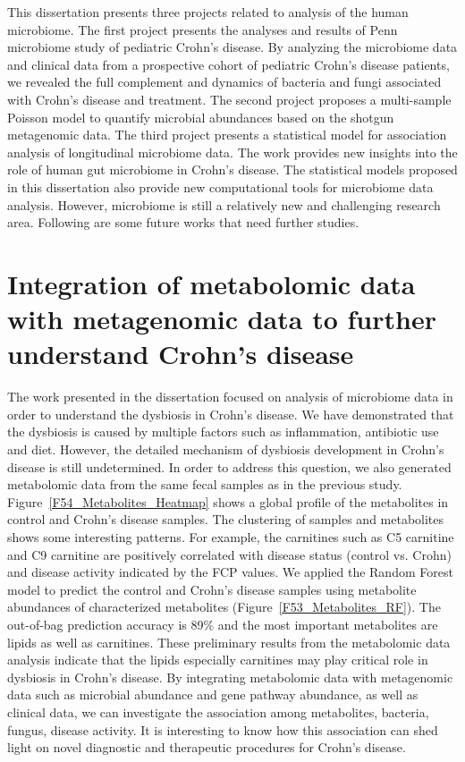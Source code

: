 \label{chpt:discussion}

This dissertation presents three projects related to analysis of the human microbiome. The first project presents the analyses and results of Penn microbiome study of pediatric Crohn's disease. By analyzing the microbiome data and clinical data from a prospective cohort of pediatric Crohn's disease patients, we revealed the full complement and dynamics of bacteria and fungi associated with Crohn's disease and treatment. The second project proposes a multi-sample Poisson model to quantify microbial abundances based on the shotgun metagenomic data. The third project presents a statistical model for association analysis of longitudinal microbiome data. The work provides new insights into the role of human gut microbiome in Crohn's disease. The statistical models proposed in this dissertation also provide new computational tools for microbiome data analysis. However, microbiome is still a relatively new and challenging research area. Following are some future works that need further studies. 

\section{Integration of metabolomic data with metagenomic data to further understand Crohn's disease}
The work presented in the dissertation focused on analysis of microbiome data in order to understand the dysbiosis in Crohn's disease. We have demonstrated that the dysbiosis is caused by multiple factors such as inflammation, antibiotic use and diet. However, the detailed mechanism of dysbiosis development in Crohn's disease is still undetermined. In order to address this question, we also generated metabolomic data from the same fecal samples as in the previous study. 
Figure~\ref{F54_Metabolites_Heatmap} shows a global profile of the metabolites in control and Crohn's disease samples.  The clustering of samples and metabolites shows some interesting patterns. For example, the carnitines such as C5 carnitine and C9 carnitine are positively correlated with disease status (control vs. Crohn) and disease activity indicated by the FCP values.  We applied the Random Forest model to predict the control and Crohn's disease samples using metabolite abundances of characterized metabolites  (Figure~\ref{F53_Metabolites_RF}). The out-of-bag prediction accuracy is 89\% and the most important metabolites are lipids as well as carnitines. These preliminary results from the metabolomic data analysis indicate that the lipids especially carnitines may play critical role in dysbiosis in Crohn's disease. By integrating metabolomic data with metagenomic data such as microbial abundance and gene pathway abundance, as well as clinical data, we can investigate the association among metabolites, bacteria, fungus, disease activity. It is interesting to know how this association can shed light on novel diagnostic and therapeutic procedures for Crohn's disease. 


